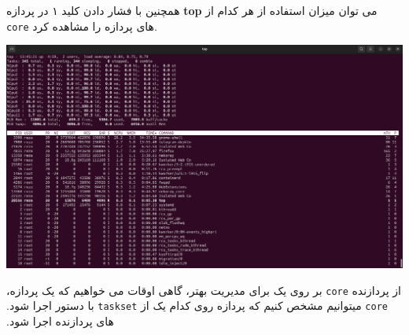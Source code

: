 همچنین با فشار دادن کلید ۱ در پردازه \textbf{top} ‫می‬ ‫توان‬ ‫میزان‬ ‫استفاده‬ ‫از‬ ‫هر‬ ‫کدام‬ ‫از‬ \texttt{core} های پردازه را مشاهده کرد.

\begin{qsolve}
	\begin{center}
		\includegraphics[width=\textwidth]{pics/img4.png}
	\end{center}
\end{qsolve}

‫گاهی ‬‫اوقات‬ ‫می‬ ‫خواهیم‬ ‫که‬ ‫یک‬ ‫پردازه‪،‬‬ ‫برای‬ ‫مدیریت‬ ‫بهتر‪،‬‬ ‫بر‬ ‫روی‬ ‫یک‬ \texttt{core} ‫از‬ ‫پردازنده‬ ‫اجرا‬ ‫شود‪.‬‬ ‫با‬ ‫دستور‬ \texttt{taskset} ‫میتوانیم‬ ‫مشخص‬ ‫کنیم‬ ‫که‬ ‫پردازه‬ ‫روی‬ ‫کدام‬ ‫یک‬ ‫از‬ ‫‪\texttt{core}‬‬ ‫های‬ ‫پردازنده‬ ‫اجرا‬ ‫شود‪.‬‬




